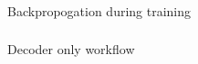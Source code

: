 		



			
			


\begin{frame}[fragile]\frametitle{}
\begin{center}
{\Large Backpropogation during training}
\end{center}
\end{frame}

\begin{frame}[fragile]\frametitle{}
\begin{center}
{\Large Decoder only workflow}
\end{center}
\end{frame}
